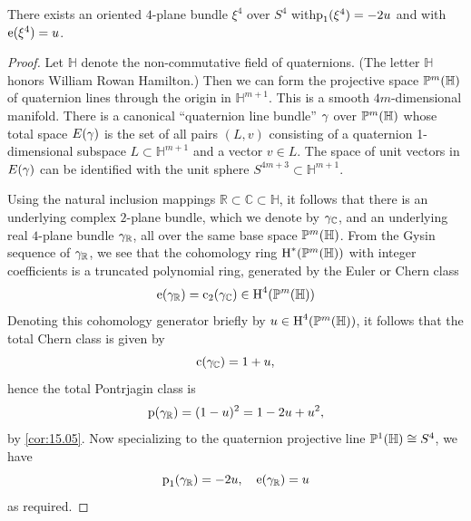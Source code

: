 \documentclass[../main]{subfiles}
\begin{document}
\begin{lemma}\label{lem:20.09}
There exists an oriented $4$-plane bundle $\xi^{4}$ over $S^{4}$ with\newline $\operatorname{p}_{1}(\xi^{4})=-2 u$ and with $\operatorname{e}(\xi^{4})=u$.
\end{lemma} 
\begin{proof} Let $\mathbb{H}$ denote the non-commutative field of quaternions. (The letter $\mathbb{H}$ honors William Rowan Hamilton.) Then we can form the projective space $\mathbb{P}^{m}(\mathbb{H})$ of quaternion lines through the origin in $\mathbb{H}^{m+1}$. This is a smooth $4 m$-dimensional manifold. There is a canonical ``quaternion line bundle'' $\gamma$ over $\mathbb{P}^{m}(\mathbb{H})$ whose total space $E(\gamma)$ is the set of all pairs $(L, v)$ consisting of a quaternion 1-dimensional subspace $L \subset \mathbb{H}^{m+1}$ and a vector $v \in L$. The space of unit vectors in $E(\gamma)$ can be identified with the unit sphere $S^{4 m+3} \subset \mathbb{H}^{m+1}$.

Using the natural inclusion mappings $\mathbb{R} \subset \mathbb{C} \subset \mathbb{H}$, it follows that there is an underlying complex $2$-plane bundle, which we denote by $\gamma_{\mathbb{C}}$, and an underlying real $4$-plane bundle $\gamma_{\mathbb{R}}$, all over the same base space $\mathbb{P}^{m}(\mathbb{H})$. From the Gysin sequence of $\gamma_{\mathbb{R}}$, we see that the cohomology ring $\operatorname{H}^{*}(\mathbb{P}^{m}(\mathbb{H}))$ with integer coefficients is a truncated polynomial ring, generated by the Euler or Chern class
\[
\operatorname{e}(\gamma_{\mathbb{R}})=\operatorname{c}_{2}(\gamma_{\mathbb{C}}) \in \operatorname{H}^{4}(\mathbb{P}^{m}(\mathbb{H}))
\]
Denoting this cohomology generator briefly by $u \in \operatorname{H}^{4}(\mathbb{P}^{m}(\mathbb{H}))$, it follows that the total Chern class is given by
\[
\operatorname{c}(\gamma_{\mathbb{C}})=1+u ,
\]
hence the total Pontrjagin class is
\[
\operatorname{p}(\gamma_{\mathbb{R}})=(1-u)^{2}=1-2 u+u^{2},
\]
by \ref{cor:15.05}. Now specializing to the quaternion projective line $\mathbb{P}^{1}(\mathbb{H}) \cong S^{4}$, we have
\[
\operatorname{p}_{1}(\gamma_{\mathbb{R}})=-2 u, \quad \operatorname{e}(\gamma_{\mathbb{R}})=u
\]
as required.
\end{proof}
\end{document}
